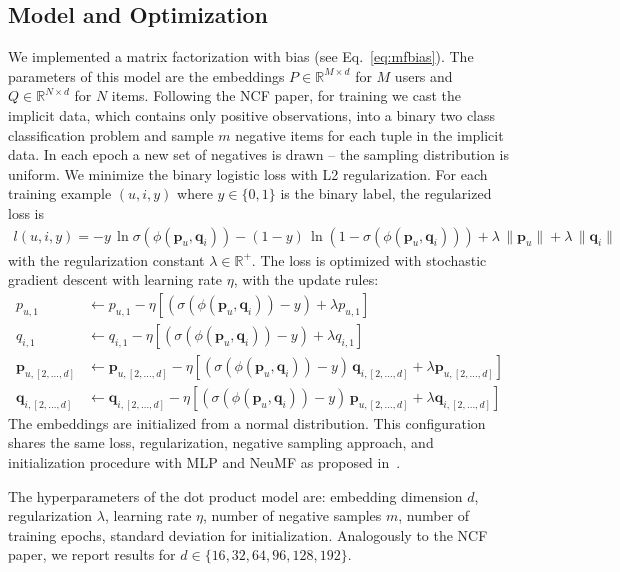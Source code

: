 \documentclass{article}
\newcommand{\Embu}{P}
\newcommand{\Embi}{Q}
\newcommand{\embu}{\mathbf{p}}
\newcommand{\embi}{\mathbf{q}}
\newcommand{\sembu}{p}
\newcommand{\sembi}{q}
\begin{document}
\subsection{Model and Optimization}
We implemented a matrix factorization with bias (see Eq.~\ref{eq:mfbias}).
The parameters of this model are the embeddings $\Embu \in \mathbb{R}^{M \times d}$ for $M$ users and $\Embi \in \mathbb{R}^{N \times d}$ for $N$ items.
Following the NCF paper, for training we cast the implicit data, which contains only positive observations, into a binary two class classification problem and sample $m$ negative items for each tuple in the implicit data.
In each epoch a new set of negatives is drawn -- the sampling distribution is uniform.
We minimize the binary logistic loss with L2 regularization.
For each training example $(u,i,y)$ where $y \in \{0,1\}$ is the binary label, the regularized loss is
\begin{align}
    l(u,i,y) = -y\,\ln \sigma(\phi(\embu_u,\embi_i)) - (1-y)\,\ln (1-\sigma(\phi(\embu_u,\embi_i))) + \lambda\,\|\embu_u\| + \lambda\,\|\embi_i\|
\end{align}
with the regularization constant $\lambda \in \mathbb{R}^+$.
The loss is optimized with stochastic gradient descent with learning rate $\eta$, with the update rules:
\begin{align}
    \sembu_{u,1} &\leftarrow \sembu_{u,1} - \eta [(\sigma(\phi(\embu_u,\embi_i)) - y)  + \lambda \sembu_{u,1}] \\
    \sembi_{i,1} &\leftarrow \sembi_{i,1} - \eta [(\sigma(\phi(\embu_u,\embi_i)) - y)  + \lambda \sembi_{i,1}] \\
    \embu_{u, [2,\ldots,d]} &\leftarrow \embu_{u, [2,\ldots,d]} - \eta [(\sigma(\phi(\embu_u,\embi_i)) - y) \, \embi_{i, [2,\ldots,d]} + \lambda \embu_{u, [2,\ldots,d]}] \\
    \embi_{i, [2,\ldots,d]} &\leftarrow \embi_{i, [2,\ldots,d]} - \eta [(\sigma(\phi(\embu_u,\embi_i)) - y) \, \embu_{u,[2,\ldots,d]} + \lambda \embi_{i, [2,\ldots,d]}]
\end{align}
The embeddings are initialized from a normal distribution.
This configuration shares the same loss, regularization, negative sampling approach, and initialization procedure with MLP and NeuMF as proposed in~\cite{he:www17}.

The hyperparameters of the dot product model are: embedding dimension $d$, regularization $\lambda$, learning rate $\eta$, number of negative samples $m$, number of training epochs, standard deviation for initialization.
Analogously to the NCF paper, we report results for $d \in \{16,32,64,96,128,192\}$.
\end{document}
